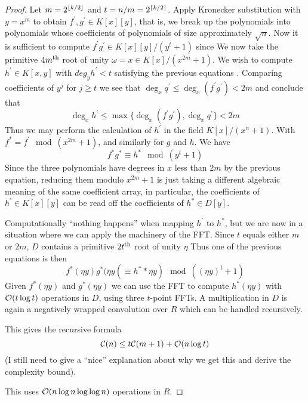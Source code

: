 \begin{proof}
    Let $m = 2^{\left \lfloor k / 2 \right \rfloor}$ and $t = n/m = 2^{\left \lceil k/2 \right \rceil}$. Apply Kronecker substitution with $y = x^m$ to obtain $f^\prime, g^\prime \in K[x][y]$, that is, we break up the polynomials into polynomials whose coefficients of polynomials of size approximately $\sqrt{n}$. Now it is sufficient to compute $f^\prime g^\prime \in K[x][y] /(y^t + 1)$ since
    We now take the primitive $4m^{\textrm{th}}$ root of unity $\omega = x \in K[x] / (x^{2m} + 1)$. We wish to compute $h^\prime \in K[x, y]$ with $deg_y h^\prime < t$ satisfying the previous equations . Comparing coefficients of $y^j$ for $j \ge t$ we see that $\deg_x q^\prime \le \deg_x (f^\prime g^\prime) < 2m$ and conclude that 
    \[
        \deg_x h^\prime \le \max \{ \deg_x(f^\prime g^\prime), \deg_x q^\prime \} < 2m
    \]
    Thus we may perform the calculation of $h^\prime$ in the field $K[x]/(x^n + 1)$.
    With $f^\ast = f^\prime \mod (x^{2m} + 1)$, and similarly for $g$ and $h$. We have
    \[
        f^\ast g^\ast \equiv h^\ast \mod (y^t + 1) 
    \]
    Since the three polynomials have degrees in $x$ less than $2m$ by the previous equation, reducing them modulo $x^{2m} + 1$ is just taking a different algebraic meaning of the same coefficient array, in particular, the coefficients of $h^\prime \in K[x][y]$ can be read off the coefficients of $h^\ast \in D[y]$.

    Computationally ``nothing happens'' when mapping $h^\prime$ to $h^\ast$, but we are now in a situation where we can apply the machinery of the FFT. Since $t$ equals either $m$ or $2m$, $D$ contains a primitive $2t^{\textrm{th}}$ root of unity $\eta$
    Thus one of the previous equations is then
    \[
        f^\ast(\eta y)g^\ast(\eta y( \equiv h^\ast*\eta y) \mod ((\eta y)^t + 1)
    \]
    Given $f^\ast(\eta y)$ and $g^\ast(\eta y)$ we can use the FFT to compute $h^\ast(\eta y)$ with $\mathcal O(t \log t)$ operations in $D$, using three $t$-point FFTs. A multiplication in $D$ is again a negatively wrapped convolution over $R$ which can be handled recursively.

    This gives the recursive formula
    \[
        \mathcal C(n) \le t\mathcal C(m + 1) + \mathcal O(n\log t)
    \]
    (I still need to give a ``nice'' explanation about why we get this and derive the complexity bound).
    
    This uses $\mathcal O(n \log n \log \log n)$ operations in $R$.
\end{proof}

